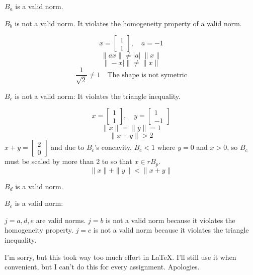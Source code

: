 \documentclass[12pt]{article}
\begin{document}
\begin{enumerate}
$B_a$ is a valid norm.

$B_b$ is not a valid norm. It violates the homogeneity property of a valid norm.

\[x=\begin{bmatrix}1\\1\end{bmatrix},\quad a=-1\]
\[\|ax\|\neq|a|\;\|x\|\]
\[\|-x|\|\neq\|x\|\]
\[\frac{1}{\sqrt{2}}\neq1\quad\text{The shape is not symetric}\]

$B_c$ is not a valid norm: It violates the triangle inequality.

\[x=\begin{bmatrix}1\\1\end{bmatrix},\quad y=\begin{bmatrix}1\\-1\end{bmatrix}\]
\[\|x\|=\|y\|=1\]
\[\|x+y\|>2\]
$x+y=\begin{bmatrix}2\\0\end{bmatrix}$ and due to $B_c$'s concavity, $B_c < 1$ where $y=0$ and $x>0$,
so $B_c$ must be scaled by more than 2 to so that $x\in rB_p$.
\[\|x\|+\|y\|<\|x+y\|\]

$B_d$ is a valid norm.

$B_e$ is a valid norm:
 
\begin{framed}
$j=a,d,e$ are valid norms. $j=b$ is not a valid norm because it violates the homogeneity property. $j=c$
is not a valid norm because it violates the triangle inequality.
\end{framed}

\end{enumerate}

I'm sorry, but this took way too much effort in LaTeX. I'll still use it when convenient, but I can't do
this for every assignment. Apologies.
\end{document}
